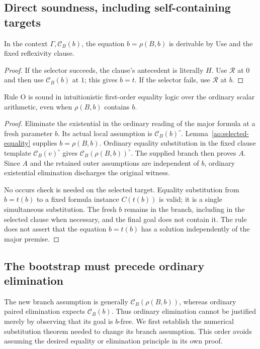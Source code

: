 \subsection{Direct soundness, including self-containing targets}

\begin{lemma}
\label{ao:selected-equality}
In the context $\Gamma,\mathcal C_B(b)$, the equation
$b=\rho(B,b)$ is derivable by Use and the fixed reflexivity clause.
\end{lemma}
\begin{proof}
If the selector succeeds, the clause's antecedent is literally $H$.
Use $\mathcal R$ at $0$ and then use $\mathcal C_B(b)$ at $1$; this
gives $b=t$.  If the selector fails, use $\mathcal R$ at $b$.
\end{proof}

\begin{theorem}
\label{ao:sound}
Rule O is sound in intuitionistic first-order equality logic over the
ordinary scalar arithmetic, even when $\rho(B,b)$ contains $b$.
\end{theorem}
\begin{proof}
Eliminate the existential in the ordinary reading of the major formula
at a fresh parameter $b$.  Its actual local assumption is
$\mathcal C_B(b)^\circ$.  Lemma~\ref{ao:selected-equality} supplies
$b=\rho(B,b)$.  Ordinary equality substitution in the fixed clause
template $\mathcal C_B(v)^\circ$ gives
$\mathcal C_B(\rho(B,b))^\circ$.  The supplied branch then proves $A$.
Since $A$ and the retained outer assumptions are independent of $b$,
ordinary existential elimination discharges the original witness.

No occurs check is needed on the selected target.  Equality substitution
from $b=t(b)$ to a fixed formula instance $C(t(b))$ is valid; it is a
single simultaneous substitution.  The fresh $b$ remains in the branch,
including in the selected clause when necessary, and the final goal does
not contain it.  The rule does not assert that the equation $b=t(b)$ has
a solution independently of the major premise.
\end{proof}

\subsection{The bootstrap must precede ordinary elimination}

The new branch assumption is generally
$\mathcal C_B(\rho(B,b))$, whereas ordinary paired elimination expects
$\mathcal C_B(b)$.  Thus ordinary elimination cannot be justified merely
by observing that its goal is $b$-free.  We first establish the numerical
substitution theorem needed to change its branch assumption.  This order
avoids assuming the desired equality or elimination principle in its own
proof.

